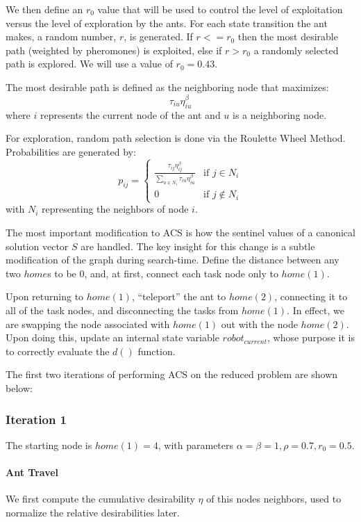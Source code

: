 \documentclass[a4paper]{article}
\newcommand{\subsubsubsection}[1]{\paragraph{#1} \mbox{}}
\begin{document}
We then define an $r_0$ value that will be used to control the level of exploitation versus the level of exploration by the ants.
For each state transition the ant makes, a random number, $r$, is generated.
If $r<=r_0$ then the most desirable path (weighted by pheromones) is exploited, else if $r>r_0$
a randomly selected path is explored. We will use a value of $r_0=0.43$.

The most desirable path is defined as the neighboring node that maximizes:
$$
\tau_{iu}\eta_{iu}^\beta
$$
where $i$ represents the current node of the ant and $u$ is a neighboring node.

For exploration, random path selection is done via the Roulette Wheel Method.
Probabilities are generated by:
$$
p_{ij}=
\begin{cases}
\frac{\tau_{ij}\eta_{ij}^\beta}{\sum\limits_{u\in N_i} \tau_{iu}\eta_{iu}^\beta} & \text{if } j \in N_i\\
0 & \text{if } j \not\in N_i
\end{cases}
$$
with $N_i$ representing the neighbors of node $i$.

The most important modification to ACS is how the sentinel values of a canonical solution vector $S$ are handled.
The key insight for this change is a subtle modification of the graph during search-time. Define the distance between any
two $home$s to be 0, and, at first, connect each task node only to $home(1)$.

Upon returning to $\mathit{home}(1)$, ``teleport'' the ant to $\mathit{home}(2)$, connecting it to all
of the task nodes, and disconnecting the tasks from $\mathit{home}(1)$. In effect, we are swapping the node associated with $\mathit{home}(1)$ out with the node $\mathit{home}(2)$. Upon doing this, update an
internal state variable $robot_{current}$, whose purpose it is to correctly
evaluate the $d()$ function.

The first two iterations of performing ACS on the reduced problem are shown below:

\subsubsection{Iteration 1}

The starting node is $\mathit{home}(1) = 4$, with parameters $\alpha = \beta = 1, \rho = 0.7, r_0 = 0.5$.

\subsubsubsection{Ant Travel}

We first compute the cumulative desirability $\eta$ of this nodes neighbors, used to normalize the relative desirabilities later.
\end{document}
